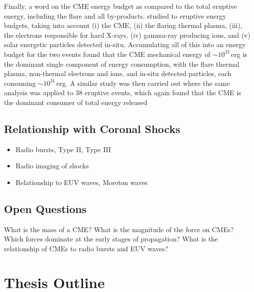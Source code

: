 Finally, a word on the CME energy budget as compared to the total eruptive energy, including the flare and all by-products. \citet{emslie2004} studied to eruptive energy budgets, taking into account (i) the CME, (ii) the flaring thermal plasma, (iii), the electrons responsible for hard X-rays, (iv) gamma-ray producing ions, and (v) solar energetic particles detected in-situ. Accumulating all of this into an energy budget for the two events found that the CME mechanical energy of $\sim10^{32}$\,erg is the dominant single component of energy consumption, with the flare thermal plasma, non-thermal electrons and ions, and in-situ detected particles, each consuming $\sim10^{31}$\,erg. A similar study was then carried out where the same analysis was applied to 38 eruptive events, which again found that the CME is the dominant consumer of total energy released \citep{emslie2012}





\subsection{Relationship with Coronal Shocks}\label{sec:21}

\begin{itemize}
\item Radio bursts, Type II, Type III
\item Radio imaging of shocks
\item Relationship to EUV waves, Moreton waves
\end{itemize}

\subsection{Open Questions}\label{sec:22}

What is the mass of a CME?
What is the magnitude of the force on CMEs?
Which forces dominate at the early stages of propagation?
What is the relationship of CMEs to radio bursts and EUV waves?

\section{Thesis Outline}






